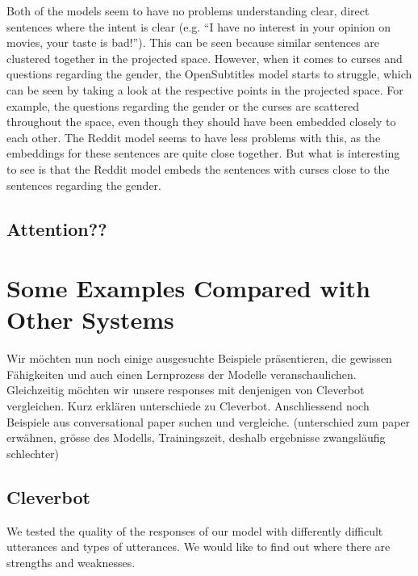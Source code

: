 Both of the models seem to have no problems understanding clear, direct sentences where the intent is clear (e.g. ``I have no interest in your opinion on movies, your taste is bad!''). This can be seen because similar sentences are clustered together in the projected space. However, when it comes to curses and questions regarding the gender, the OpenSubtitles model starts to struggle, which can be seen by taking a look at the respective points in the projected space. For example, the questions regarding the gender or the curses are scattered throughout the space, even though they should have been embedded closely to each other. The Reddit model seems to have less problems with this, as the embeddings for these sentences are quite close together. But what is interesting to see is that the Reddit model embeds the sentences with curses close to the sentences regarding the gender.

\subsection{Attention??}
\section{Some Examples Compared with Other Systems}
Wir möchten nun noch einige ausgesuchte Beispiele präsentieren, die gewissen Fähigkeiten und auch einen Lernprozess der Modelle veranschaulichen. Gleichzeitig möchten wir unsere responses mit denjenigen von Cleverbot vergleichen. Kurz erklären unterschiede zu Cleverbot.
Anschliessend noch Beispiele aus conversational paper suchen und vergleiche. (unterschied zum paper erwähnen, grösse des Modells, Trainingszeit, deshalb ergebnisse zwangsläufig schlechter)

\subsection{Cleverbot}


We tested the quality of the responses of our model with differently difficult utterances and types of utterances. We would like to find out where there are strengths and weaknesses.

